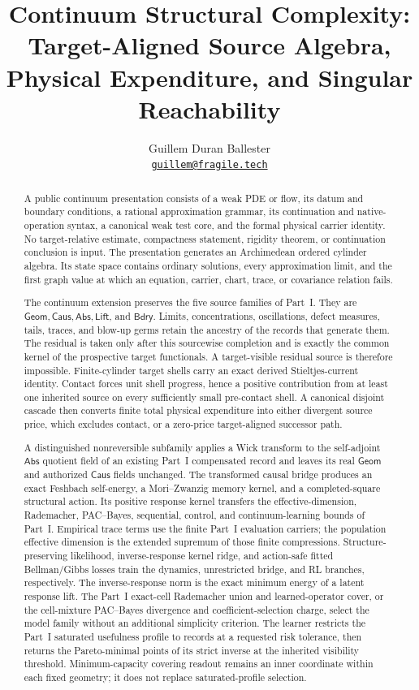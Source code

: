 \documentclass[11pt]{article}
\title{Continuum Structural Complexity:\\
Target-Aligned Source Algebra, Physical Expenditure, and Singular Reachability}
\author{Guillem Duran Ballester\\
\href{mailto:guillem@fragile.tech}{\texttt{guillem@fragile.tech}}}
\date{}
\numberwithin{section}{part}
\theoremstyle{plain}
\theoremstyle{definition}
\theoremstyle{remark}
\newcommand{\Geom}{\mathsf{Geom}}
\newcommand{\Caus}{\mathsf{Caus}}
\newcommand{\Abs}{\mathsf{Abs}}
\newcommand{\Lift}{\mathsf{Lift}}
\newcommand{\Bdry}{\mathsf{Bdry}}
\begin{document}
\maketitle

\begin{abstract}
A public continuum presentation consists of a weak PDE or flow, its datum and
boundary conditions, a rational approximation grammar, its continuation and
native-operation syntax, a canonical weak test core, and the formal physical
carrier identity.  No target-relative estimate, compactness statement,
rigidity theorem, or continuation conclusion is input.  The presentation
generates an Archimedean ordered cylinder algebra.  Its state space contains
ordinary solutions, every approximation limit, and the first graph value at
which an equation, carrier, chart, trace, or covariance relation fails.

The continuum extension preserves the five source families of Part~I.  They
are \(\Geom,\Caus,\Abs,\Lift\), and \(\Bdry\).  Limits, concentrations, oscillations,
defect measures, tails, traces, and blow-up germs retain the ancestry of the
records that generate them.  The residual is taken only after this sourcewise
completion and is exactly the common kernel of the prospective target
functionals.  A target-visible residual source is therefore impossible.
Finite-cylinder target shells carry an exact derived Stieltjes-current
identity.  Contact forces unit shell progress, hence a positive contribution
from at least one inherited source on every sufficiently small pre-contact
shell.  A canonical disjoint cascade then converts finite total physical
expenditure into either divergent source price, which excludes contact, or a
zero-price target-aligned successor path.

A distinguished nonreversible subfamily applies a Wick transform to the
self-adjoint \(\Abs\) quotient field of an existing Part~I compensated
record and leaves its real \(\Geom\) and authorized \(\Caus\) fields
unchanged.  The transformed causal
bridge produces an exact Feshbach self-energy, a Mori--Zwanzig memory kernel,
and a completed-square structural action.  Its positive response kernel
transfers the effective-dimension, Rademacher, PAC--Bayes, sequential, control,
and continuum-learning bounds of Part~I.  Empirical trace terms use the
finite Part~I evaluation carriers; the population effective dimension is the
extended supremum of those finite compressions.  Structure-preserving likelihood,
inverse-response kernel ridge, and action-safe fitted Bellman/Gibbs losses
train the dynamics, unrestricted bridge, and RL branches, respectively.  The
inverse-response norm is the exact minimum energy of a latent response lift.
The Part~I exact-cell Rademacher union and learned-operator cover, or the
cell-mixture PAC--Bayes divergence and coefficient-selection charge, select
the model family without an additional simplicity criterion.  The learner
restricts the Part~I saturated usefulness profile to records at a requested
risk tolerance, then returns the Pareto-minimal points of its strict inverse
at the inherited visibility threshold.  Minimum-capacity covering readout
remains an inner coordinate within each fixed geometry; it does not replace
saturated-profile selection.


\end{abstract}
\end{document}
